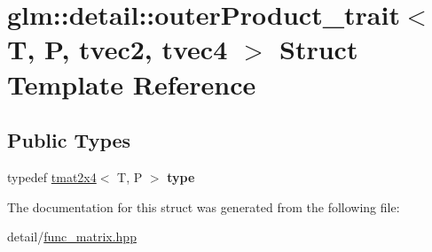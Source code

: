 \hypertarget{structglm_1_1detail_1_1outerProduct__trait_3_01T_00_01P_00_01tvec2_00_01tvec4_01_4}{\section{glm\-:\-:detail\-:\-:outer\-Product\-\_\-trait$<$ T, P, tvec2, tvec4 $>$ Struct Template Reference}
\label{structglm_1_1detail_1_1outerProduct__trait_3_01T_00_01P_00_01tvec2_00_01tvec4_01_4}
}
\subsection*{Public Types}
\begin{DoxyCompactItemize}
\item 
\hypertarget{structglm_1_1detail_1_1outerProduct__trait_3_01T_00_01P_00_01tvec2_00_01tvec4_01_4_a5ca49ab58d1c30d858b622c06147cd57}{typedef \hyperlink{structglm_1_1tmat2x4}{tmat2x4}$<$ T, P $>$ {\bfseries type}}\label{structglm_1_1detail_1_1outerProduct__trait_3_01T_00_01P_00_01tvec2_00_01tvec4_01_4_a5ca49ab58d1c30d858b622c06147cd57}

\end{DoxyCompactItemize}


The documentation for this struct was generated from the following file\-:\begin{DoxyCompactItemize}
\item 
detail/\hyperlink{func__matrix_8hpp}{func\-\_\-matrix.\-hpp}\end{DoxyCompactItemize}
